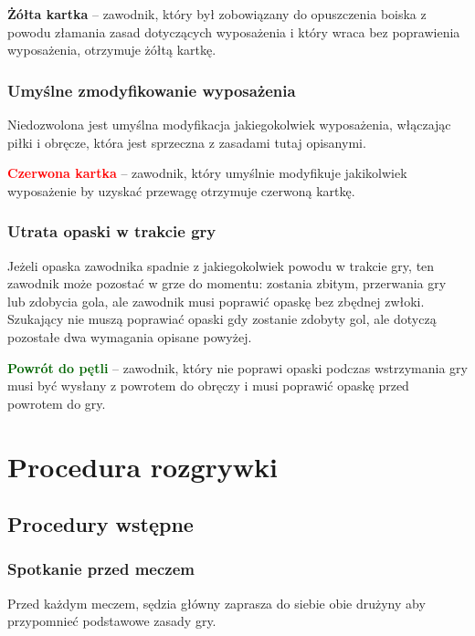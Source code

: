 \documentclass[12pt]{article}
\newcommand\redcard[1]{\bgroup\textcolor{red}{\textbf{#1}}}
\newcommand\yellowcard[1]{\bgroup\textcolor{darkyellow}{\textbf{#1}}}
\newcommand\other[1]{\bgroup\textcolor{darkgreen}{\textbf{#1}}}
\begin{document}
\yellowcard{Żółta kartka} -- zawodnik, który był zobowiązany do opuszczenia
boiska z powodu złamania zasad dotyczących wyposażenia i który wraca bez
poprawienia wyposażenia, otrzymuje żółtą kartkę.

\subsubsection{Umyślne zmodyfikowanie wyposażenia}
Niedozwolona jest
umyślna modyfikacja jakiegokolwiek wyposażenia, włączając piłki i
obręcze, która jest sprzeczna z zasadami tutaj opisanymi.

\redcard{Czerwona kartka} -- zawodnik, który umyślnie modyfikuje
jakikolwiek wyposażenie by uzyskać przewagę otrzymuje czerwoną kartkę.

\subsubsection{Utrata opaski w trakcie gry}
Jeżeli opaska zawodnika
spadnie z jakiegokolwiek powodu w trakcie gry, ten zawodnik może
pozostać w grze do momentu: zostania zbitym, przerwania gry lub zdobycia
gola, ale zawodnik musi poprawić opaskę bez zbędnej zwłoki. Szukający
nie muszą poprawiać opaski gdy zostanie zdobyty gol, ale dotyczą
pozostałe dwa wymagania opisane powyżej.

\other{Powrót do pętli} -- zawodnik, który nie poprawi opaski podczas
wstrzymania gry musi być wysłany z powrotem do obręczy i musi poprawić
opaskę przed powrotem do gry.

\pagebreak
\section{Procedura rozgrywki}

\subsection{Procedury wstępne}

\subsubsection{Spotkanie przed meczem}
Przed każdym meczem, sędzia
główny zaprasza do siebie obie drużyny aby przypomnieć podstawowe zasady
gry.
\end{document}
